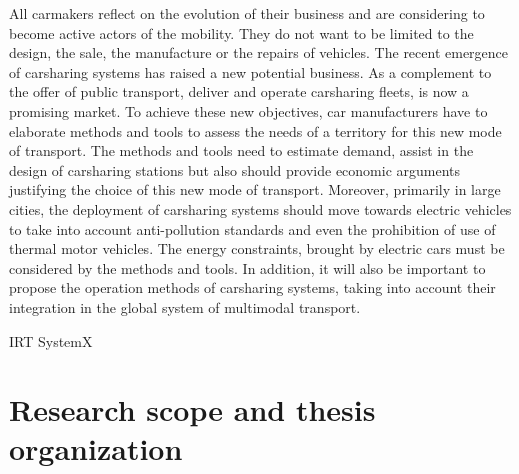 \begin{bibunit}[ieeetr]
All carmakers reflect on the evolution of their business and are considering to become active actors of the mobility. 
They do not want to be limited to the design, the sale, the manufacture or the repairs of vehicles.
The recent emergence of carsharing systems has raised a new potential business.
As a complement to the offer of public transport, deliver and operate carsharing fleets, is now a promising market.
To achieve these new objectives, car manufacturers have to elaborate methods and tools to assess the needs of a territory for this new mode of transport.
The methods and tools need to estimate demand, assist in the design of carsharing stations but also should provide economic arguments justifying the choice of this new mode of transport.
Moreover, primarily in large cities, the deployment of carsharing systems should move towards electric vehicles to take into account anti-pollution standards and even the prohibition of use of thermal motor vehicles.
The energy constraints, brought by electric cars must be considered by the methods and tools.
In addition, it will also be important to propose the operation methods of carsharing systems, taking into account their integration in the global system of multimodal transport.

\medskip
IRT SystemX

\section{Research scope and thesis organization}
\medskip %






\newpage
{}
\renewcommand{\bibname}{Bibliography of chapter \thechapter}
\end{bibunit}
